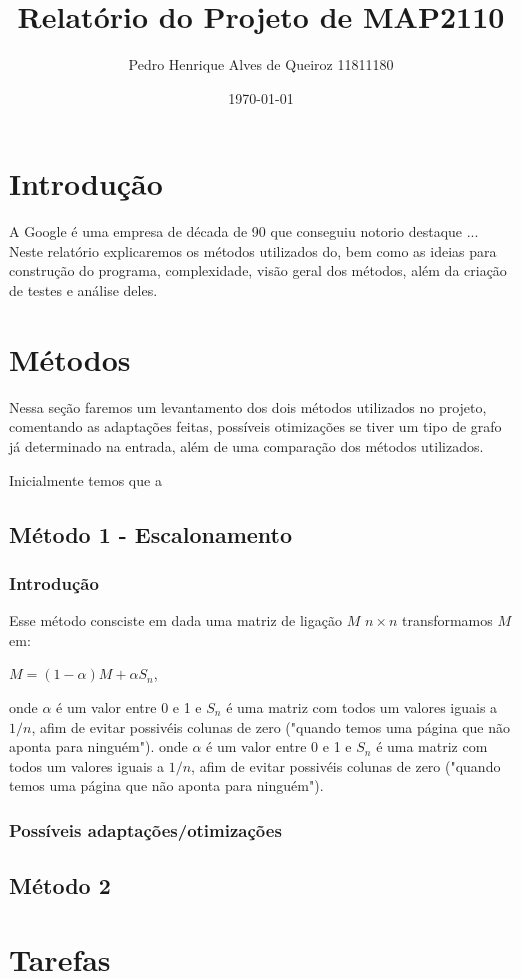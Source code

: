 \documentclass[12pt]{article}
\title{\textbf{Relatório do Projeto de MAP2110}}
\author{Pedro Henrique Alves de Queiroz 11811180}
\date{\today}
\begin{document}
    
\maketitle

	
\section{Introdução}
    A Google é uma empresa de década de 90 que conseguiu notorio destaque ... Neste relatório explicaremos os métodos utilizados do, bem como as ideias para construção do programa, complexidade, visão geral dos métodos, além da criação de testes e análise deles. 

\vspace{5em}

\section{Métodos}
	Nessa seção faremos um levantamento dos dois métodos utilizados no projeto, comentando as adaptações feitas, possíveis otimizações se tiver um tipo de grafo já determinado na entrada, além de uma comparação dos métodos utilizados. 
	
	Inicialmente temos que a 
	 \subsection{Método 1 - Escalonamento}
    	\subsubsection{Introdução}
    		Esse método consciste em dada uma matriz de ligação $M$ $n\times n$ transformamos $M$ em:
    	
    		\vspace{1em}
    		\centerline{$M = (1-\alpha)M + \alpha S_n$,} 
    		\vspace{0.3em}
    		
    	 	onde $\alpha$ é um valor entre 0 e 1 e $S_n$ é uma matriz com todos um valores iguais a $1/n$, afim de evitar possivéis colunas de zero ("quando temos uma página que não aponta para ninguém"). onde $\alpha$ é um valor entre 0 e 1 e $S_n$ é uma matriz com todos um valores iguais a $1/n$, afim de evitar possivéis colunas de zero ("quando temos uma página que não aponta para ninguém").
    	\subsubsection{Possíveis adaptações/otimizações}
    	
    \subsection{Método 2}

\vspace{5em}
   
\section{Tarefas}

	
\end{document}

